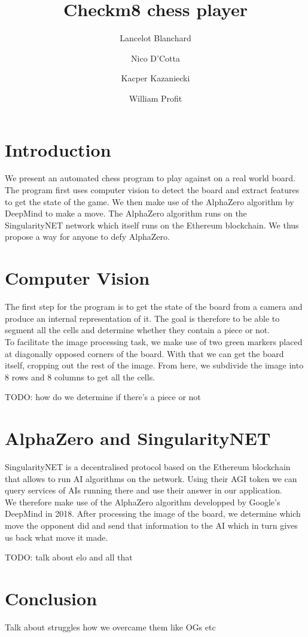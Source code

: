 \documentclass[11pt]{article}
\begin{document}
\title{Checkm8 chess player}
\author{Lancelot Blanchard \and Nico D'Cotta \and Kacper Kazaniecki \and William Profit}

\maketitle

\section{Introduction}

We present an automated chess program to play against on a real world board. The
program first uses computer vision to detect the board and extract features to
get the state of the game. We then make use of the AlphaZero algorithm by
DeepMind to make a move. The AlphaZero algorithm runs on the SingularityNET
network which itself runs on the Ethereum blockchain. We thus propose a way for
anyone to defy AlphaZero.

\section{Computer Vision}

The first step for the program is to get the state of the board from a camera
and produce an internal representation of it. The goal is therefore to be able
to segment all the cells and determine whether they contain a piece or not.\\
To facilitate the image processing task, we make use of two green markers placed
at diagonally opposed corners of the board. With that we can get the board
itself, cropping out the rest of the image. From here, we subdivide the image
into 8 rows and 8 columns to get all the cells.

TODO: how do we determine if there's a piece or not

\section{AlphaZero and SingularityNET}

SingularityNET is a decentralised protocol based on the Ethereum blockchain that
allows to run AI algorithms on the network. Using their AGI token we can query
services of AIs running there and use their answer in our application.\\
We therefore make use of the AlphaZero algorithm developped by Google's DeepMind
in 2018. After processing the image of the board, we determine which move the
opponent did and send that information to the AI which in turn gives us back
what move it made.

TODO: talk about elo and all that

\section{Conclusion}
Talk about struggles how we overcame them like OGs etc
\end{document}
